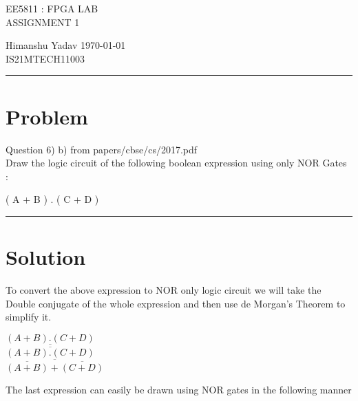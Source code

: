 \documentclass[10pt,a4paper]{article}
\begin{document}
\begin{center}

{\huge EE5811 : FPGA LAB}\\
{\large ASSIGNMENT 1}

\end{center}
Himanshu Yadav \hfill \today \\ IS21MTECH11003

\vspace{15pt}
\hrule
\vspace{5pt}


\section*{Problem}

Question 6) b) from papers/cbse/cs/2017.pdf\\
Draw the logic circuit of the following boolean expression using only NOR Gates :

\begin{center}
    ( A + B ) . ( C + D )
\end{center}


\vspace{15pt}
\hrule
\vspace{5pt}

\section*{Solution}
To convert the above expression to NOR only logic circuit we will take the Double conjugate of the whole expression and then use de Morgan's Theorem to simplify it.

\begin{center}
   $( A + B ) . ( C + D )$\\
   \vspace{5pt}
   $\overline{\overline{( A + B ) . ( C + D )}}$
   \\
   \vspace{5pt}
   $\overline{\overline{( A + B )} + \overline{( C + D )}}$
    
\end{center}
The last expression can easily be drawn using NOR gates in the following manner
\end{document}
